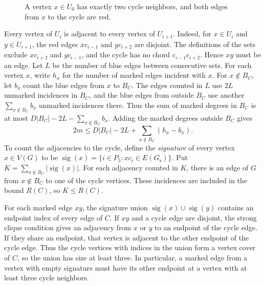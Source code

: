 \documentclass[preprint,11pt,numbers]{elsarticle-arxiv}
\numberwithin{equation}{section}
\theoremstyle{definition}
\begin{document}
\begin{figure}[htbp]
\centering
{}
\caption{A vertex $x\in U_0$ has exactly two cycle neighbors, and
both edges from $x$ to the cycle are red.}
\label{fig:main-uniform-cycle-parts}
\end{figure}

Every vertex of $U_i$ is adjacent to every vertex of $U_{i+1}$.
Indeed, for $x\in U_i$ and $y\in U_{i+1}$, the red edges
$xc_{i-1}$ and $yc_{i+2}$ are disjoint. The definitions of the
sets exclude $xc_{i+2}$ and $yc_{i-1}$, and the cycle has no
chord $c_{i-1}c_{i+2}$. Hence $xy$ must be an edge. Let $L$ be
the number of blue edges between consecutive sets. For each
vertex $x$, write $h_x$ for the number of marked edges incident
with $x$. For $x\notin B_C$, let $b_x$ count the blue edges
from $x$ to $B_C$. The edges counted in $L$ use $2L$ unmarked
incidences in $B_C$, and the blue edges from outside $B_C$ use
another $\sum_{x\notin B_C}b_x$ unmarked incidences there.
Thus the sum of marked degrees in $B_C$ is at most
$D|B_C|-2L-\sum_{x\notin B_C}b_x$. Adding the marked degrees
outside $B_C$ gives
\begin{equation}\label{eq:main-uniform-core-cut}
 2m\leq D|B_C|-2L+\sum_{x\notin B_C}(h_x-b_x).
\end{equation}
To count the adjacencies to the cycle, define the
\emph{signature} of every vertex $x\in V(G)$ to be
$\operatorname{sig}(x)=\{i\in P_5:xc_i\in E(G_{\mathrm s})\}$.
Put $K=\sum_{x\notin B_C}|\operatorname{sig}(x)|$. For each
adjacency counted in $K$, there is an edge of $G$ from
$x\notin B_C$ to one of the cycle vertices. These incidences
are included in the bound $R(C)$, so $K\leq R(C)$.

For each marked edge $xy$, the signature union
$\operatorname{sig}(x)\cup\operatorname{sig}(y)$ contains an
endpoint index of every edge of $C$. If $xy$ and a cycle edge
are disjoint, the strong clique condition gives an adjacency
from $x$ or $y$ to an endpoint of the cycle edge. If they share
an endpoint, that vertex is adjacent to the other endpoint of
the cycle edge. Thus the cycle vertices with indices in the union
form a vertex cover of $C$, so the union has size at least three.
In particular, a marked
edge from a vertex with empty signature must have its other
endpoint at a vertex with at least three cycle neighbors.
\end{document}
